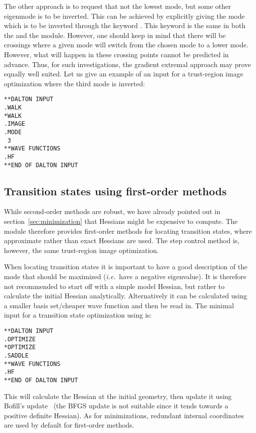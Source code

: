 The other approach is to request
that not the lowest mode, but some other eigenmode is to be inverted.
This can be achieved by explicitly giving the mode which is to be
inverted through the keyword . This keyword is the same in
both the  and the  module. However, one
should keep in mind that there will be crossings where a given mode
will switch from the chosen mode to a lower mode. However, what will happen
in these crossing points cannot be predicted in advance. Thus, for such
investigations, the gradient extremal approach may prove equally well
suited. Let us give an example of an input for a trust-region
image optimization where the third mode is inverted:

\begin{verbatim}
**DALTON INPUT
.WALK
*WALK
.IMAGE
.MODE
 3
**WAVE FUNCTIONS
.HF
**END OF DALTON INPUT
\end{verbatim}

\subsection{Transition states using first-order
methods}\label{sec:saddle1stord}

While second-order methods are robust, we have already pointed out
in section~\ref{sec:minimization} that Hessians might be expensive to
compute. The  module therefore provides first-order
methods for locating transition states, where approximate rather than
exact Hessians are used. The step control method is, however, the same
trust-region image optimization.

When locating transition states it is important to have a good
description of the mode that should be maximized ({\it i.e.}~have a negative
eigenvalue). It is therefore not recommended to start off with a
simple model Hessian, but rather to calculate the initial Hessian
analytically. Alternatively it can be calculated using a smaller basis
set/cheaper wave function and then be read in. The minimal input for a
transition state optimization using  is:
\begin{verbatim}
**DALTON INPUT
.OPTIMIZE
*OPTIMIZE
.SADDLE
**WAVE FUNCTIONS
.HF
**END OF DALTON INPUT
\end{verbatim}
This will calculate the Hessian at the initial geometry, then update
it using Bofill's
update~\cite{jmbjcc15}
(the BFGS update is not suitable since
it tends towards a positive definite Hessian). As for minimizations,
redundant internal coordinates are used by default for first-order
methods.

